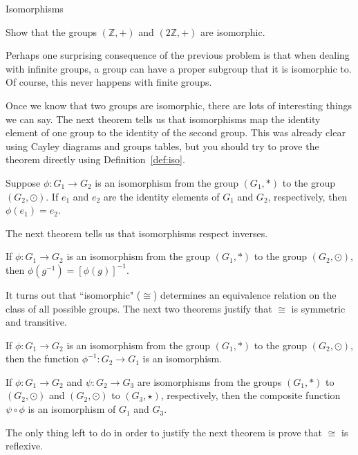 \begin{section}{Isomorphisms}
\begin{problem}
Show that the groups $(\mathbb{Z},+)$ and $(2\mathbb{Z},+)$ are isomorphic.
\end{problem}

Perhaps one surprising consequence of the previous problem is that when dealing with infinite groups, a group can have a proper subgroup that it is isomorphic to.  Of course, this never happens with finite groups.

Once we know that two groups are isomorphic, there are lots of interesting things we can say.  The next theorem tells us that isomorphisms map the identity element of one group to the identity of the second group.  This was already clear using Cayley diagrams and groups tables, but you should try to prove the theorem directly using Definition~\ref{def:iso}.

\begin{theorem}\label{thm:hom_id}
Suppose $\phi:G_1\to G_2$ is an isomorphism from the group $(G_1,*)$ to the group $(G_2,\odot)$.  If $e_1$ and $e_2$ are the identity elements of $G_1$ and $G_2$, respectively, then $\phi(e_1)=e_2$.
\end{theorem}

The next theorem tells us that isomorphisms respect inverses.

\begin{theorem}\label{thm:hom_inverse}
If $\phi:G_1\to G_2$ is an isomorphism from the group $(G_1,*)$ to the group $(G_2,\odot)$, then $\phi(g^{-1})=[\phi(g)]^{-1}$.
\end{theorem}

It turns out that ``isomorphic" ($\cong$) determines an equivalence relation on the class of all possible groups.  The next two theorems justify that $\cong$ is symmetric and transitive.

\begin{theorem}
If $\phi:G_1\to G_2$ is an isomorphism from the group $(G_1,*)$ to the group $(G_2,\odot)$, then the function $\phi^{-1}:G_2\to G_1$ is an isomorphism.
\end{theorem}

\begin{theorem}
If $\phi:G_1\to G_2$ and $\psi:G_2\to G_3$ are isomorphisms from the groups $(G_1,*)$ to $(G_2,\odot)$ and $(G_2,\odot)$ to $(G_3,\star)$, respectively, then the composite function $\psi\circ\phi$ is an isomorphism of $G_1$ and $G_3$.
\end{theorem}

The only thing left to do in order to justify the next theorem is prove that $\cong$ is reflexive.


\end{section}
